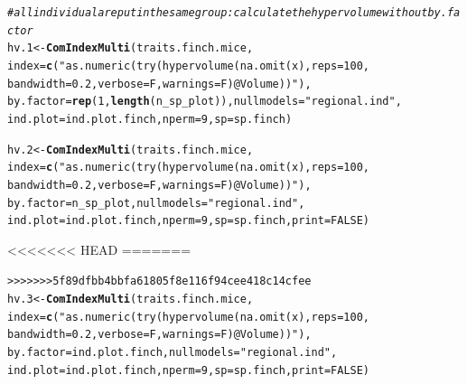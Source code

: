 \documentclass[12pt]{article}\usepackage[]{graphicx}\usepackage[]{color}
\makeatletter
\newcommand{\hlnum}[1]{\textcolor[rgb]{0.686,0.059,0.569}{#1}}%
\newcommand{\hlstr}[1]{\textcolor[rgb]{0.192,0.494,0.8}{#1}}%
\newcommand{\hlcom}[1]{\textcolor[rgb]{0.678,0.584,0.686}{\textit{#1}}}%
\newcommand{\hlstd}[1]{\textcolor[rgb]{0.345,0.345,0.345}{#1}}%
\newcommand{\hlkwb}[1]{\textcolor[rgb]{0.69,0.353,0.396}{#1}}%
\newcommand{\hlkwc}[1]{\textcolor[rgb]{0.333,0.667,0.333}{#1}}%
\newcommand{\hlkwd}[1]{\textcolor[rgb]{0.737,0.353,0.396}{\textbf{#1}}}%
\newenvironment{kframe}{%
 \def\at@end@of@kframe{}%
 \ifinner\ifhmode%
  \def\at@end@of@kframe{\end{minipage}}%
  \begin{minipage}{\columnwidth}%
 \fi\fi%
 \def\FrameCommand##1{\hskip\@totalleftmargin \hskip-\fboxsep
 \colorbox{shadecolor}{##1}\hskip-\fboxsep
     \hskip-\linewidth \hskip-\@totalleftmargin \hskip\columnwidth}%
 \MakeFramed {\advance\hsize-\width
   \@totalleftmargin\z@ \linewidth\hsize
   \@setminipage}}%
 {\par\unskip\endMakeFramed%
 \at@end@of@kframe}
\newenvironment{knitrout}{}{} %
\makeatother
\begin{document}
\begin{knitrout}
\color{fgcolor}\begin{kframe}
\begin{alltt}
\hlcom{#all individual are put in the same group: calculate the hypervolume without by.factor}
\hlstd{hv.1}\hlkwb{<-}\hlkwd{ComIndexMulti}\hlstd{(traits.finch.mice,}
             \hlkwc{index} \hlstd{=} \hlkwd{c}\hlstd{(}\hlstr{"as.numeric(try(hypervolume(na.omit(x), reps = 100, 
                 bandwidth = 0.2, verbose = F, warnings = F)@Volume))"}\hlstd{),}
             \hlkwc{by.factor} \hlstd{=} \hlkwd{rep}\hlstd{(}\hlnum{1}\hlstd{,}\hlkwd{length}\hlstd{(n_sp_plot)),} \hlkwc{nullmodels} \hlstd{=} \hlstr{"regional.ind"}\hlstd{,}
             \hlkwc{ind.plot} \hlstd{= ind.plot.finch,} \hlkwc{nperm} \hlstd{=} \hlnum{9}\hlstd{,} \hlkwc{sp} \hlstd{= sp.finch)}
\end{alltt}


{\ttfamily\noindent\bfseries{}}\begin{alltt}
\hlstd{hv.2}\hlkwb{<-}\hlkwd{ComIndexMulti}\hlstd{(traits.finch.mice,}
             \hlkwc{index} \hlstd{=} \hlkwd{c}\hlstd{(}\hlstr{"as.numeric(try(hypervolume(na.omit(x), reps = 100, 
                 bandwidth = 0.2, verbose = F, warnings = F)@Volume))"}\hlstd{),}
             \hlkwc{by.factor} \hlstd{= n_sp_plot,} \hlkwc{nullmodels} \hlstd{=} \hlstr{"regional.ind"}\hlstd{,}
             \hlkwc{ind.plot} \hlstd{= ind.plot.finch,} \hlkwc{nperm} \hlstd{=} \hlnum{9}\hlstd{,} \hlkwc{sp} \hlstd{= sp.finch,} \hlkwc{print} \hlstd{=} \hlnum{FALSE}\hlstd{)}
\end{alltt}


<<<<<<< HEAD
=======
{\ttfamily\noindent\bfseries{}}\begin{alltt}
>>>>>>> 5f89dfbb4bbfa61805f8e116f94cee418c14cfee
\hlstd{hv.3}\hlkwb{<-}\hlkwd{ComIndexMulti}\hlstd{(traits.finch.mice,}
             \hlkwc{index} \hlstd{=} \hlkwd{c}\hlstd{(}\hlstr{"as.numeric(try(hypervolume(na.omit(x), reps = 100,
                 bandwidth = 0.2, verbose = F, warnings = F)@Volume))"}\hlstd{),}
             \hlkwc{by.factor} \hlstd{= ind.plot.finch,} \hlkwc{nullmodels} \hlstd{=}\hlstr{"regional.ind"}\hlstd{,}
             \hlkwc{ind.plot} \hlstd{= ind.plot.finch,} \hlkwc{nperm} \hlstd{=} \hlnum{9}\hlstd{,} \hlkwc{sp} \hlstd{= sp.finch,} \hlkwc{print} \hlstd{=} \hlnum{FALSE}\hlstd{)}
\end{alltt}



\end{kframe}
\end{knitrout}
\end{document}
